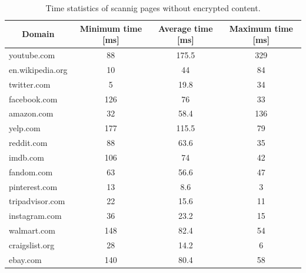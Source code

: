 \begin{table}[]
\label{tab:time}
\begin{tabular}{|l|c|c|c|}
\hline
\multicolumn{1}{|c|}{Domain} & Minimum time {[}ms{]} & Average time {[}ms{]} & Maximum time {[}ms{]} \\ \hline
youtube.com                  & 88                    & 175.5                 & 329                   \\ \hline
en.wikipedia.org             & 10                    & 44                    & 84                    \\ \hline
twitter.com                  & 5                     & 19.8                  & 34                    \\ \hline
facebook.com                 & 126                   & 76                    & 33                    \\ \hline
amazon.com                   & 32                    & 58.4                  & 136                   \\ \hline
yelp.com                     & 177                   & 115.5                 & 79                    \\ \hline
reddit.com                   & 88                    & 63.6                  & 35                    \\ \hline
imdb.com                     & 106                   & 74                    & 42                    \\ \hline
fandom.com                   & 63                    & 56.6                  & 47                    \\ \hline
pinterest.com                & 13                    & 8.6                   & 3                     \\ \hline
tripadvisor.com              & 22                    & 15.6                  & 11                    \\ \hline
instagram.com                & 36                    & 23.2                  & 15                    \\ \hline
walmart.com                  & 148                   & 82.4                  & 54                    \\ \hline
craigslist.org               & 28                    & 14.2                  & 6                     \\ \hline
ebay.com                     & 140                   & 80.4                  & 58                    \\ \hline
\end{tabular}
\caption{Time statistics of scannig pages without encrypted content.}
\end{table}

